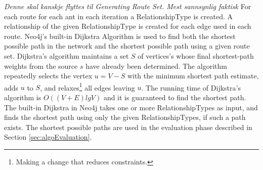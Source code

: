 \emph{\color{blue}Denne skal kanskje flyttes til Generating Route Set. Mest sannsynlig faktisk}
For each route for each ant in each iteration a RelationshipType is created. A relationship of the given RelationshipType is created for each edge used in each route. Neo4j's built-in Dijkstra Algorithm is used to find both the shortest possible path in the network and the shortest possible path using a given route set. Dijkstra's algorithm \cite[p.658-662]{cormen09} maintains a set $S$ of vertices's whose final shortest-path weights from the source $s$ have already been determined. The algorithm repeatedly selects the vertex $u = V - S$ with the minimum shortest path estimate, adds $u$ to $S$, and relaxes\footnote{Making a change that reduces constraints.} all edges leaving $u$. The running time of Dijkstra's algorithm is $O((V + E)lg V)$ and it is guaranteed to find the shortest path\cite[p.~661]{cormen09}. The built-in Dijkstra in Neo4j takes one or more RelationshipTypes as input, and finds the shortest path using only the given RelationshipTypes, if such a path exists. The shortest possible paths are used in the evaluation phase described in Section \vref{sec:algoEvaluation}.



